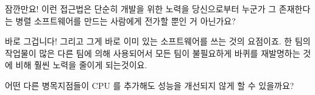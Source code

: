 \QuickQ{}
	잠깐만요!
	이런 접근법은 단순히 개발을 위한 노력을 당신으로부터 누군가 그
	존재한다는 병렬 소프트웨어를 만드는 사람에게 전가할 뿐인 거 아닌가요?

\QuickA{}
	바로 그겁니다!
	그리고 그게 바로 이미 있는 소프트웨어를 쓰는 것의 요점이죠.
	한 팀의 작업물이 많은 다른 팀에 의해 사용되어서 모든 팀이 불필요하게
	바퀴를 재발명하는 것에 비해 훨씬 노력을 줄이게 되는것이요.

\QuickQ{}
	어떤 다른 병목지점들이 CPU 를 추가해도 성능을 개선되지 않게 할 수
	있을까요?

